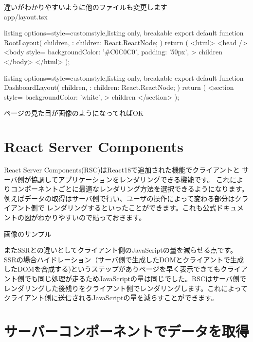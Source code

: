 違いがわかりやすいように他のファイルも変更します\\
app/layout.tsx
\begin{tcblisting}{listing options={style=customstyle},listing only, breakable}
  export default function RootLayout({
      children,
    }: {
  children: React.ReactNode;
  }) {
  return (
  <html>
  <head />
  <body
  style={{
      backgroundColor: '#C0C0C0',
      padding: '50px',
    }}
  >
    {children}
  </body>
  </html>
  );
  }

\end{tcblisting}




\begin{tcblisting}{listing options={style=customstyle},listing only, breakable}
  export default function DashboardLayout({
      children,
    }: {
  children: React.ReactNode;
  }) {
  return (
  <section
  style={{
      backgroundColor: 'white',
    }}
  >
    {children}
  </section>
  );
  }
\end{tcblisting}



ページの見た目が画像のようになってればOK









\section{React Server Components}
React Server Components(RSC)はReact18で追加された機能でクライアントと
サーバ側が協調してアプリケーションをレンダリングできる機能です。
これによりコンポーネントごとに最適なレンダリング方法を選択できるようになります。
例えばデータの取得はサーバ側で行い、ユーザの操作によって変わる部分はクライアント側で
レンダリングするといったことができます。これも公式ドキュメントの図がわかりやすいので貼っておきます。


画像のサンプル



またSSRとの違いとしてクライアント側のJavaScriptの量を減らせる点です。
SSRの場合ハイドレーション（サーバ側で生成したDOMとクライアントで生成したDOMを合成する)というステップがありページを早く表示できてもクライアント側でも同じ処理が走るためJavaScriptの量は同じでした。RSCはサーバ側でレンダリングした後残りをクライアント側でレンダリングします。これによってクライアント側に送信されるJavaScriptの量を減らすことができます。


\section{サーバーコンポーネントでデータを取得}


